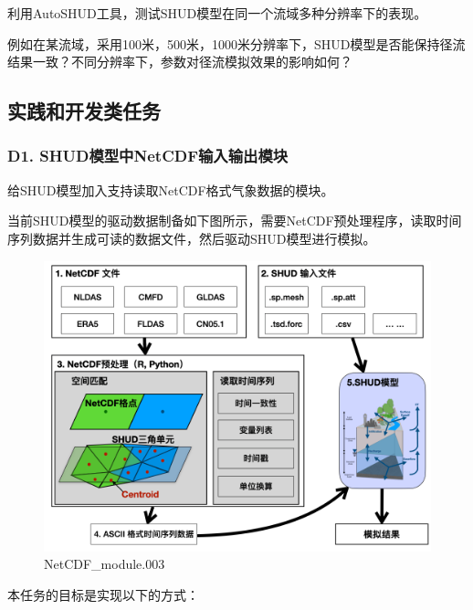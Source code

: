 \documentclass[
]{book}
\begin{document}
利用AutoSHUD工具，测试SHUD模型在同一个流域多种分辨率下的表现。

例如在某流域，采用100米，500米，1000米分辨率下，SHUD模型是否能保持径流结果一致？不同分辨率下，参数对径流模拟效果的影响如何？

\hypertarget{ux5b9eux8df5ux548cux5f00ux53d1ux7c7bux4efbux52a1}{%
\subsection{实践和开发类任务}\label{ux5b9eux8df5ux548cux5f00ux53d1ux7c7bux4efbux52a1}}

\hypertarget{d1.-shudux6a21ux578bux4e2dnetcdfux8f93ux5165ux8f93ux51faux6a21ux5757}{%
\subsubsection{\texorpdfstring{\textbf{D1. SHUD模型中NetCDF输入输出模块}}{D1. SHUD模型中NetCDF输入输出模块}}\label{d1.-shudux6a21ux578bux4e2dnetcdfux8f93ux5165ux8f93ux51faux6a21ux5757}}

给SHUD模型加入支持读取NetCDF格式气象数据的模块。

当前SHUD模型的驱动数据制备如下图所示，需要NetCDF预处理程序，读取时间序列数据并生成可读的数据文件，然后驱动SHUD模型进行模拟。

\begin{figure}
\centering
\includegraphics{_index.assets/NetCDF_module.003.png}
\caption{NetCDF\_module.003}
\end{figure}

本任务的目标是实现以下的方式：
\end{document}
